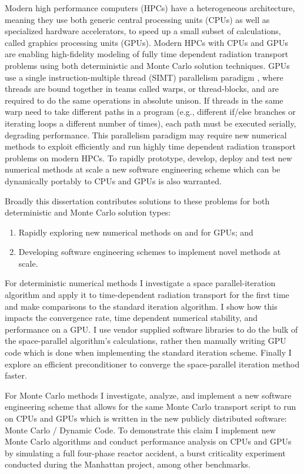 Modern high performance computers (HPCs) have a heterogeneous architecture, meaning they use both generic central processing units (CPUs) as well as specialized hardware accelerators, to speed up a small subset of calculations, called graphics processing units (GPUs).
Modern HPCs with CPUs and GPUs are enabling high-fidelity modeling of fully time dependent radiation transport problems using both deterministic and Monte Carlo solution techniques.
GPUs use a single instruction-multiple thread (SIMT) parallelism paradigm \cite{cuda}, where threads are bound together in teams called warps, or thread-blocks, and are required to do the same operations in absolute unison. 
If threads in the same warp need to take different paths in a program (e.g., different if/else branches or iterating loops a different number of times), each path must be executed serially, degrading performance.
This parallelism paradigm may require new numerical methods to exploit efficiently and run highly time dependent radiation transport problems on modern HPCs.
To rapidly prototype, develop, deploy and test new numerical methods at scale a new software engineering scheme which can be dynamically portably to CPUs and GPUs is also warranted.

Broadly this dissertation contributes solutions to these problems for both deterministic and Monte Carlo solution types:
\begin{enumerate}
    \item Rapidly exploring new numerical methods on and for GPUs; and
    \item Developing software engineering schemes to implement novel methods at scale.
\end{enumerate}

For deterministic numerical methods I investigate a space parallel-iteration algorithm and apply it to time-dependent radiation transport for the first time and make comparisons to the standard iteration algorithm.
I show how this impacts the convergence rate, time dependent numerical stability, and performance on a GPU.
I use vendor supplied software libraries to do the bulk of the space-parallel algorithm's calculations, rather then manually writing GPU code which is done when implementing the standard iteration scheme.
Finally I explore an efficient preconditioner to converge the space-parallel iteration method faster.

For Monte Carlo methods I investigate, analyze, and implement a new software engineering scheme that allows for the same Monte Carlo transport script to run on CPUs and GPUs which is written in the new publicly distributed software: Monte Carlo / Dynamic Code.
To demonstrate this claim I implement new Monte Carlo algorithms and conduct performance analysis on CPUs and GPUs by simulating a full four-phase reactor accident, a burst criticality experiment conducted during the Manhattan project, among other benchmarks.

